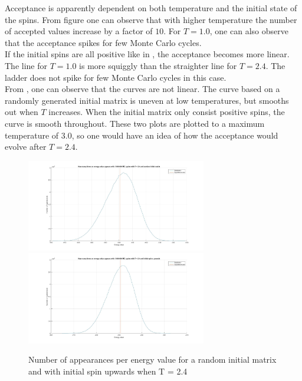 \documentclass[10pt,a4paper]{article}
\begin{document}
\noindent Acceptance is apparently dependent on both temperature and the initial state of the spins. From figure  one can observe that with higher temperature the number of accepted values increase by a factor of $10$. For $T = 1.0$, one can also observe that the acceptance spikes for few Monte Carlo cycles. 
\\
If the initial spins are all positive like in , the acceptance becomes more linear. The line for $T = 1.0$ is more squiggly than the straighter line for $T = 2.4$. The ladder does not spike for few Monte Carlo cycles in this case.
\\
From , one can observe that the curves are not linear. The curve based on a randomly generated initial matrix is uneven at low temperatures, but smooths out when $T$ increases. When the initial matrix only consist positive spins, the curve is smooth throughout. These two plots are plotted to a maximum temperature of $3.0$, so one would have an idea of how the acceptance would evolve after $T = 2.4$. 

\begin{figure}[H]
\centerline{
\includegraphics[width=0.7\textwidth]{energyappearanceT24random}
\includegraphics[width=0.7\textwidth]{energyappearanceT24upspin}
}
\caption{Number of appearances per energy value for a random initial matrix and with initial spin upwards when T = 2.4}
\label{fig:energyappearance}
\end{figure}
\end{document}
